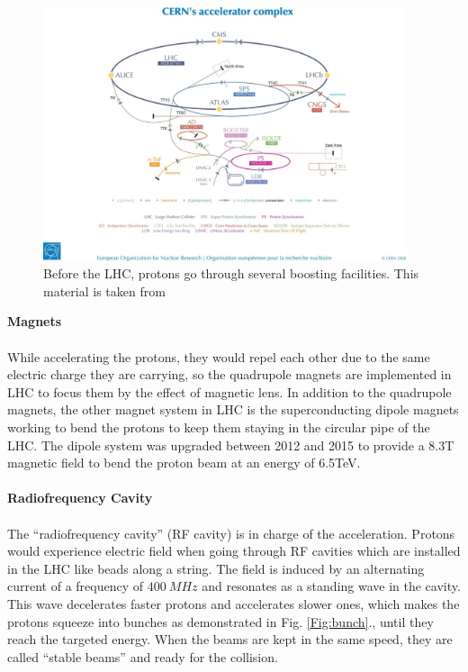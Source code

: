 \\
\begin{figure}[!h]                
	\includegraphics[width=0.95\textwidth]{Chapter2/pre-acceleration.jpg}
	\centering
	\begin{center}
		\caption{Before the LHC, protons go through several boosting facilities. This material is taken from \cite{Mobs:2197559}}
		\label{Fig:boost}            
	\end{center}
\end{figure}
{\bf Magnets}
\\
\\While accelerating the protons, they  would repel each other due to the same electric charge they are carrying, so the quadrupole magnets are implemented in LHC to focus them by the effect of magnetic lens. In addition to the quadrupole magnets, the other magnet system in LHC is the superconducting dipole magnets working to bend the protons to keep them staying in the circular pipe of the LHC. The dipole system was upgraded between 2012 and 2015 to provide a 8.3T magnetic field to bend the proton beam at an energy of 6.5TeV.
\\
\\{\bf Radiofrequency Cavity\cite{Radiofrequency:1997424}}  
\\
\\The ``radiofrequency cavity'' (RF cavity) is in charge of the acceleration. Protons would experience electric field when going through RF cavities which are installed in the LHC like beads along a string. The field is induced by an alternating current of a frequency of $400~MHz$ and resonates as a standing wave in the cavity. This wave decelerates faster protons and accelerates slower ones, which makes the protons squeeze into bunches as demonstrated in Fig. \ref{Fig:bunch}., until they reach the targeted energy. When the beams are kept in the same speed, they are called ``stable beams'' and ready for the collision. 
